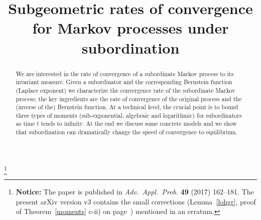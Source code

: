 \documentclass{aptpub}
\numberwithin{equation}{section}
\begin{document}
\title{Subgeometric rates of convergence\\
for Markov processes under subordination} %




\footnote{\textbf{Notice:} The paper is published in \emph{Adv.\ Appl.\ Prob.} \textbf{49} (2017) 162--181. The present arXiv version v3 contains the small corrections (Lemma~\ref{lohgr}, proof of Theorem~\ref{moments} c-ii) on page~\pageref{bigtime}) mentioned in an erratum.}

\begin{abstract}
    We are interested in the rate of convergence of a subordinate Markov process to its invariant measure. Given a subordinator and the corresponding Bernstein function (Laplace exponent) we characterize the convergence rate of the subordinate Markov process; the key ingredients are the rate of convergence of the original process and the (inverse of the) Bernstein function. At a technical level, the crucial point is to bound three types of
    moments (sub-exponential, algebraic and logarithmic) for
    subordinators as time $t$ tends to infinity. At the end we discuss some concrete models and we show that subordination can dramatically change the speed of convergence to equilibrium.
\end{abstract}


\end{document}
